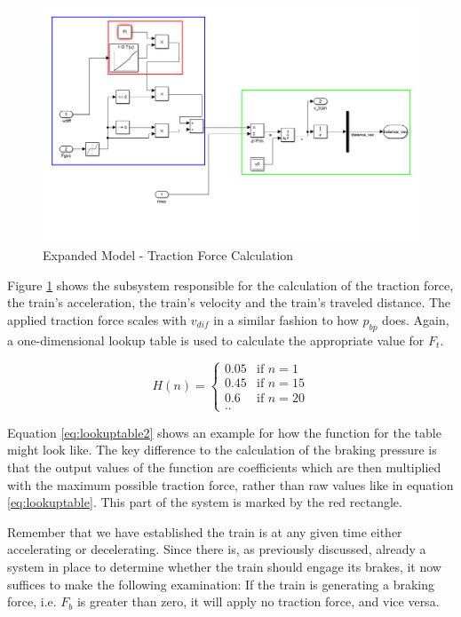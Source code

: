 \begin{figure}[htb!]
	\centering
	\includegraphics[width=\linewidth]{./pic/expandedmodel_force}
	\caption{Expanded Model - Traction Force Calculation}
	\label{fig:expandedmodel_force}
\end{figure}

\par\noindent
Figure \ref{fig:expandedmodel_force} shows the subsystem responsible for the calculation of the traction force, the train's acceleration, the train's velocity and the train's traveled distance. The applied traction force scales with $v_{dif}$ in a similar fashion to how $p_{bp}$ does. Again, a one-dimensional lookup table is used to calculate the appropriate value for $F_{t}$.

\begin{equation}
\label{eq:lookuptable2}
H(n) =
\begin{cases}
0.05 & \text{if $n=1$} \\
0.45 & \text{if $n=15$} \\
0.6 & \text{if $n=20$} \\
\text{..}
\end{cases}
\end{equation}

\noindent
Equation \ref{eq:lookuptable2} shows an example for how the function for the table might look like. The key difference to the calculation of the braking pressure is that the output values of the function are coefficients which are then multiplied with the maximum possible traction force, rather than raw values like in equation \ref{eq:lookuptable}. This part of the system is marked by the red rectangle. 
\par
Remember that we have established the train is at any given time either accelerating or decelerating. Since there is, as previously discussed, already a system in place to determine whether the train should engage its brakes, it now suffices to make the following examination: If the train is generating a braking force, i.e. $F_{b}$ is greater than zero, it will apply no traction force, and vice versa.
 
